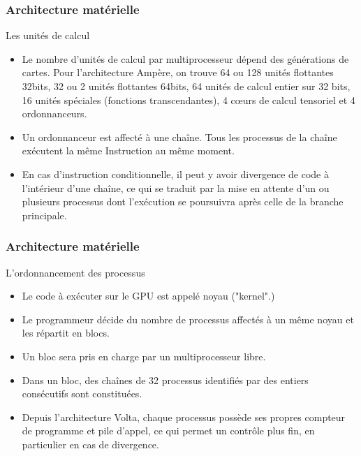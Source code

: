\begin{frame}
    \frametitle{Architecture matérielle}
\begin{block}{Les unités de calcul}
   \begin{itemize}
    \item<+-> Le nombre d'unités de calcul par multiprocesseur dépend des générations de cartes. Pour l'architecture 
    Ampère, on trouve 64 ou 128 unités flottantes 32bits, 32 ou 2 unités flottantes 64bits, 64 unités de calcul entier
    sur 32 bits, 16 unités spéciales (fonctions transcendantes), 4 cœurs de calcul tensoriel et 4 ordonnanceurs.
    \item<+-> Un ordonnanceur est affecté à une chaîne. Tous les processus de la chaîne exécutent la même Instruction
    au même moment.
    \item<+-> En cas d'instruction conditionnelle, il peut y avoir divergence de code à l'intérieur d'une chaîne, ce qui se traduit par la 
    mise en attente d'un ou plusieurs processus dont l'exécution se poursuivra après celle de la branche principale. 
   \end{itemize} 
\end{block}
\end{frame}
\begin{frame}
    \frametitle{Architecture matérielle}
\begin{block}{L'ordonnancement des processus}
   \begin{itemize}
    \item<+-> Le code à exécuter sur le GPU est appelé noyau ("kernel".)
    \item<+-> Le programmeur décide du nombre de processus affectés à un même noyau et les répartit en blocs.
    \item<+-> Un bloc sera pris en charge par un multiprocesseur libre.
    \item<+-> Dans un bloc, des chaînes de 32 processus identifiés par des entiers consécutifs sont constituées. 
    \item<+-> Depuis l'architecture Volta, chaque processus possède ses propres compteur de programme et pile d'appel,
    ce qui permet un contrôle plus fin, en particulier en cas de divergence.
   \end{itemize} 
\end{block}
\end{frame}
